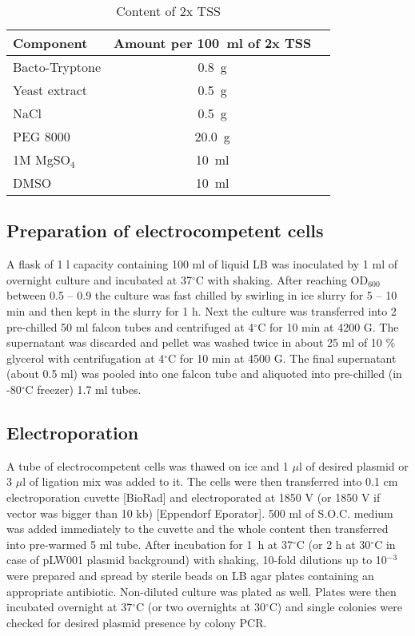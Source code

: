 
\begin{center}
	\begin{longtable}[c]{|l|c|c|}
\caption{Content of 2x TSS} \label{tss} \\

\toprule \multicolumn{1}{|l|}{\textbf{Component}} & \multicolumn{1}{c|}{\textbf{Amount per 100~ml of 2x TSS}} \\
\midrule
\endhead

\bottomrule
\endlastfoot

Bacto-Tryptone & 0.8~g \\
\hline
Yeast extract & 0.5~g \\
\hline
NaCl & 0.5~g \\
\hline
PEG 8000 & 20.0~g \\
\hline
1M MgSO$_{4}$ & 10~ml \\
\hline
DMSO & 10~ml \\
	\end{longtable}
\end{center}

\subsection{Preparation of electrocompetent cells}
A flask of 1 l capacity containing 100 ml of liquid LB was inoculated by 1 ml of overnight culture and incubated at 37$^{\circ}$C with shaking.
After reaching OD$_{600}$ between 0.5 -- 0.9 the culture was fast chilled by swirling in ice slurry for 5 -- 10 min and then kept in the slurry for 1 h.
Next the culture was transferred into 2 pre-chilled 50 ml falcon tubes and centrifuged  at 4$^{\circ}$C for 10 min at 4200 G.
The supernatant was discarded and pellet was washed twice in about 25 ml of 10 \% glycerol with centrifugation at 4$^{\circ}$C for 10 min at 4500 G.
The final supernatant (about 0.5 ml) was pooled into one falcon tube and aliquoted into pre-chilled (in -80$^{\circ}$C freezer) 1.7 ml tubes.

\subsection{Electroporation}
A tube of electrocompetent cells was thawed on ice and 1 $\mu$l of desired plasmid or 3 $\mu$l of ligation mix was added to it.
The cells were then transferred into 0.1 cm electroporation cuvette [BioRad] and electroporated at 1850 V (or 1850 V if vector was bigger than 10 kb) [Eppendorf Eporator\textsuperscript{\textregistered}].
500 ml of S.O.C. medium was added immediately to the cuvette and the whole content then transferred into pre-warmed 5 ml tube.
After incubation for 1~h at 37$^{\circ}$C (or 2 h at 30$^{\circ}$C in case of pLW001 plasmid background) with shaking, 10-fold dilutions up to 10$^{-3}$ were prepared and spread by sterile beads on LB agar plates containing an appropriate antibiotic.
Non-diluted culture was plated as well.
Plates were then incubated overnight at 37$^{\circ}$C (or two overnights at 30$^{\circ}$C) and single colonies were checked for desired plasmid presence by colony PCR.


